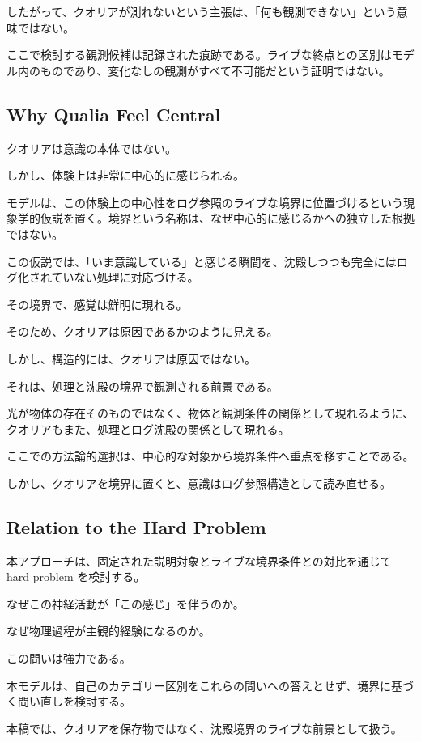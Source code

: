 したがって、クオリアが測れないという主張は、「何も観測できない」という意味ではない。

ここで検討する観測候補は記録された痕跡である。ライブな終点との区別はモデル内のものであり、変化なしの観測がすべて不可能だという証明ではない。

\subsection{Why Qualia Feel Central}

クオリアは意識の本体ではない。

しかし、体験上は非常に中心的に感じられる。

モデルは、この体験上の中心性をログ参照のライブな境界に位置づけるという現象学的仮説を置く。境界という名称は、なぜ中心的に感じるかへの独立した根拠ではない。

この仮説では、「いま意識している」と感じる瞬間を、沈殿しつつも完全にはログ化されていない処理に対応づける。

その境界で、感覚は鮮明に現れる。

そのため、クオリアは原因であるかのように見える。

しかし、構造的には、クオリアは原因ではない。

それは、処理と沈殿の境界で観測される前景である。

光が物体の存在そのものではなく、物体と観測条件の関係として現れるように、クオリアもまた、処理とログ沈殿の関係として現れる。

ここでの方法論的選択は、中心的な対象から境界条件へ重点を移すことである。

しかし、クオリアを境界に置くと、意識はログ参照構造として読み直せる。

\subsection{Relation to the Hard Problem}

本アプローチは、固定された説明対象とライブな境界条件との対比を通じて hard problem を検討する。

なぜこの神経活動が「この感じ」を伴うのか。

なぜ物理過程が主観的経験になるのか。

この問いは強力である。

本モデルは、自己のカテゴリー区別をこれらの問いへの答えとせず、境界に基づく問い直しを検討する。

本稿では、クオリアを保存物ではなく、沈殿境界のライブな前景として扱う。

